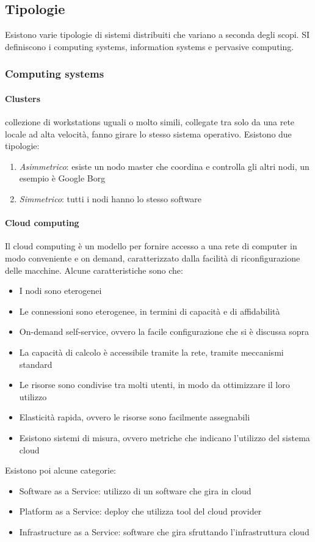 \subsection{Tipologie}
Esistono varie tipologie di sistemi distribuiti che variano a seconda degli 
scopi. SI definiscono i computing systems, information systems e pervasive computing.
\subsubsection{Computing systems}
\paragraph{Clusters} collezione di workstations uguali o molto simili, 
collegate tra solo da una rete locale ad alta velocità, fanno girare lo 
stesso sistema operativo.
Esistono due tipologie:
\begin{enumerate}
    \item \emph{Asimmetrico}: esiste un nodo master che coordina 
    e controlla gli altri nodi, un esempio è Google Borg
    \item \emph{Simmetrico}: tutti i nodi hanno lo stesso software
\end{enumerate}

\paragraph{Cloud computing}
Il cloud computing è un modello per fornire accesso a una rete di 
computer in modo conveniente e on demand, caratterizzato dalla 
facilità di riconfigurazione delle macchine.
Alcune caratteristiche sono che:
\begin{itemize}
    \item I nodi sono eterogenei
    \item Le connessioni sono eterogenee, in termini di capacità e di affidabilità
    \item On-demand self-service, ovvero la facile configurazione che si è discussa sopra
    \item La capacità di calcolo è accessibile tramite la rete, tramite meccanismi 
    standard
    \item Le risorse sono condivise tra molti utenti, in modo da ottimizzare il loro utilizzo
    \item Elasticità rapida, ovvero le risorse sono facilmente assegnabili
    \item Esistono sistemi di misura, ovvero metriche che indicano l'utilizzo 
    del sistema cloud
\end{itemize}
Esistono poi alcune categorie: 
\begin{itemize}
    \item Software as a Service: utilizzo di un software che gira in cloud
    \item Platform as a Service: deploy che utilizza tool del cloud provider
    \item Infrastructure as a Service: software che gira sfruttando l'infrastruttura cloud
\end{itemize}

